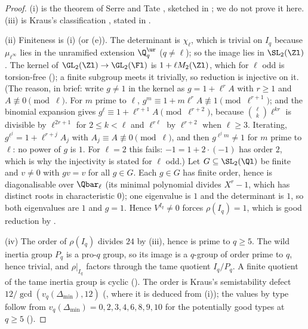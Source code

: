 \begin{proof}
(i) is the theorem of Serre and Tate \cite[Section 2]{SerreTate68}, sketched in ; we do not prove it here. (iii) is Kraus's
classification \cite{Kraus90}, stated in .

(ii) Finiteness is (i) (or (e)). The determinant is $\chi_\ell$, which is trivial on $I_q$ because $\mu_{\ell^\infty}$ lies in the
unramified extension $\Q_q^{\ur}$ ($q\ne\ell$); so the image lies in $\SL_2(\Zl)$. The kernel of $\GL_2(\Zl)\to\GL_2(\Fl)$ is $1+\ell M_2(\Zl)$, which for $\ell$ odd is
torsion-free (); a finite subgroup meets it trivially, so reduction is injective on it. (The reason, in brief: write $g\ne1$ in the kernel as
$g=1+\ell^rA$ with $r\ge1$ and $A\not\equiv0\pmod\ell$. For $m$ prime to $\ell$, $g^m\equiv1+m\ell^rA\not\equiv1\pmod{\ell^{r+1}}$; and the binomial expansion gives
$g^\ell\equiv1+\ell^{r+1}A\pmod{\ell^{r+2}}$, because $\binom\ell k\ell^{kr}$ is divisible by $\ell^{2r+1}$ for $2\le k<\ell$ and $\ell^{r\ell}$ by $\ell^{r+2}$ when $\ell\ge3$. Iterating, $g^{\ell^j}=1+\ell^{r+j}A_j$ with
$A_j\equiv A\not\equiv0\pmod\ell$, and then $g^{\ell^jm}\ne1$ for $m$ prime to $\ell$: no power of $g$ is $1$.
For $\ell=2$ this fails: $-1=1+2\cdot(-1)$ has order $2$, which is why the injectivity is stated for $\ell$ odd.) Let $G\subseteq\SL_2(\Ql)$ be finite and $v\ne0$
with $gv=v$ for all $g\in G$. Each $g\in G$ has finite order, hence is diagonalisable over $\Qbar_\ell$ (its minimal polynomial divides $X^r-1$,
which has distinct roots in characteristic $0$); one eigenvalue is $1$ and the determinant is $1$, so both eigenvalues are $1$ and $g=1$. Hence
$V^{I_q}\ne0$ forces $\rho(I_q)=1$, which is good reduction by .

(iv) The order of $\rho(I_q)$ divides $24$ by (iii), hence is prime to $q\ge5$. The wild inertia group $P_q$ is a pro-$q$ group, so its image is a
$q$-group of order prime to $q$, hence trivial, and $\rho|_{I_q}$ factors through the tame quotient $I_q/P_q$. A finite quotient of the tame
inertia group is cyclic (). The order is Kraus's semistability defect $12/\gcd(v_q(\Delta_{\min}),12)$ (, where
it is deduced from (i)); the values by type follow from $v_q(\Delta_{\min})=0,2,3,4,6,8,9,10$ for the potentially good types at $q\ge5$
().
\end{proof}

